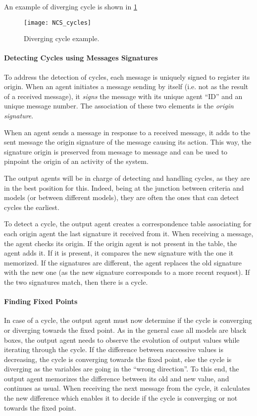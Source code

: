 An example of diverging cycle is shown in \figurename{} \ref{NCS_cycles_fig}

\begin{figure}
\centering
\texttt{[image: NCS\_cycles]}
\caption{Diverging cycle example.}\label{NCS_cycles_fig}
\end{figure}

\paragraph*{Detecting Cycles using Messages Signatures}
To address the detection of cycles, each message is uniquely signed to register its origin. When an agent initiates a message sending by itself (i.e. not as the result of a received message), it \emph{signs} the message with its unique agent \enquote{ID} and an unique message number. The association of these two elements is the \emph{origin signature}.

When an agent sends a message in response to a received message, it adds to the sent message the origin signature of the message causing its action. This way, the signature origin is preserved from message to message and can be used to pinpoint the origin of an activity of the system.

The output agents will be in charge of detecting and handling cycles, as they are in the best position for this. Indeed, being at the junction between criteria and models (or between different models), they are often the ones that can detect cycles the earliest.

To detect a cycle, the output agent creates a correspondence table associating for each origin agent the last signature it received from it. When receiving a message, the agent checks its origin. If the origin agent is not present in the table, the agent adds it. If it is present, it compares the new signature with the one it memorized. If the signatures are different, the agent replaces the old signature with the new one (as the new signature corresponds to a more recent request). If the two signatures match, then there is a cycle.

\paragraph*{Finding Fixed Points}
In case of a cycle, the output agent must now determine if the cycle is converging or diverging towards the fixed point. As in the general case all models are black boxes, the output agent needs to observe the evolution of output values while iterating through the cycle. If the difference between successive values is decreasing, the cycle is converging towards the fixed point, else the cycle is diverging as the variables are going in the \enquote{wrong direction}. To this end, the output agent memorizes the difference between its old and new value, and continues as usual. When receiving the next message from the cycle, it calculates the new difference which enables it to decide if the cycle is converging or not towards the fixed point.

